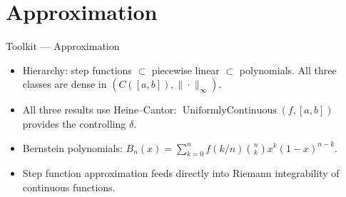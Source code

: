 
\section{Approximation}

\begin{toolkitbox}{Toolkit --- Approximation}
\begin{itemize}
  \item Hierarchy: step functions $\subset$ piecewise linear $\subset$
    polynomials. All three classes are dense in $(C([a,b]),\|\cdot\|_\infty)$.
  \item All three results use Heine--Cantor: $\operatorname{UniformlyContinuous}(f,[a,b])$
    provides the controlling $\delta$.
  \item Bernstein polynomials: $B_n(x)=\sum_{k=0}^n f(k/n)\binom{n}{k}x^k(1-x)^{n-k}$.
  \item Step function approximation feeds directly into Riemann
    integrability of continuous functions.
\end{itemize}
\end{toolkitbox}



